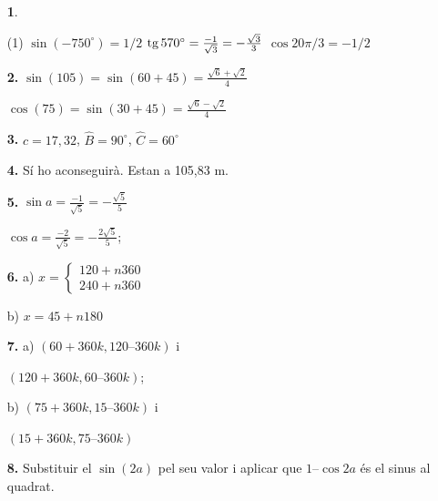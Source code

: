 \documentclass[a4paper, pdf, twoside]{book}
\begin{document}
\begin{multicols}{2}
\begin{enumerate}
 \item[\fontfamily{phv}\selectfont\color{blue}\textbf{1}. ]  \scalebox{0.6}{\simbolclau } 
 \begin{tasks}[column-sep=1em, item-indent=1.3333em](1)
	 \task $\sin (-750^\circ )=1/2$
	 \task* $\mathrm{tg}\, 570^\circ =\frac {-1}{\sqrt 3}=-\frac {\sqrt 3}{3}$
	 \task $\cos 20\pi /3 = -1/2$
\end{tasks}
\vspace{0.25cm}
\item[\fontfamily{phv}\selectfont\color{blue}\textbf{2. }]  \scalebox{0.6}{\simbolclau } 
$\sin (105)=\sin (60+45)=\frac {\sqrt {6}+\sqrt {2}}{4}$ \par $\cos (75)=\sin (30+45)=\frac {\sqrt {6}-\sqrt {2}}{4}$
\vspace{0.25cm}
\item[\fontfamily{phv}\selectfont\color{blue}\textbf{3. }]  \scalebox{0.6}{\simbolclau } 
$c=17,32$, $\hat B=90^\circ $, $\hat C=60^\circ $
\vspace{0.25cm}
\item[\fontfamily{phv}\selectfont\color{blue}\textbf{4. }]  \scalebox{0.6}{\simbolclau } 
Sí ho aconseguirà. Estan a 105,83 m.
\vspace{0.25cm}
\item[\fontfamily{phv}\selectfont\color{blue}\textbf{5. }]  \scalebox{0.6}{\simbolclau } 
$\sin a=\frac {-1}{\sqrt 5}=-\frac {\sqrt 5}{5}$\par $\cos a=\frac {-2}{\sqrt 5}=-\frac {2\sqrt 5}{5}$;
\vspace{0.25cm}
\item[\fontfamily{phv}\selectfont\color{blue}\textbf{6. }]  \scalebox{0.6}{\simbolclau } 
a) $x=\left \{\begin {array}{l} 120 + n 360 \\ 240 +n 360 \end {array}\right .$ \par b) $x=45 + n 180$
\vspace{0.25cm}
\item[\fontfamily{phv}\selectfont\color{blue}\textbf{7. }]  \scalebox{0.6}{\simbolclau } 
a) $(60+360k,120–360k)$ i \par $(120+360k,60–360k)$; \par b) $(75+360k, 15–360k)$ i \par $(15+360k, 75–360k)$
\vspace{0.25cm}
\item[\fontfamily{phv}\selectfont\color{blue}\textbf{8. }]  \scalebox{0.6}{\simbolclau } 
Substituir el $\sin (2a)$ pel seu valor i aplicar que $1–\cos 2a$ és el sinus al quadrat.

\end{enumerate}
\end{multicols}
\end{document}
